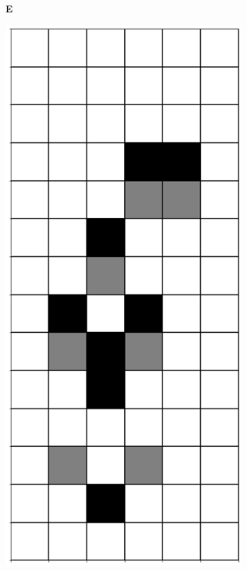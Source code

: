 \documentclass[12pt]{article}
\numberwithin{figure}{section} %
\begin{document}
\begin{figure}[H]
     	\begin{subfigure}[t]{0.03\textwidth}
    		\textbf{E}
  	\end{subfigure}		
        \begin{subfigure}{0.3\textwidth}
     		\centering
     		\includegraphics[angle=270,width=\linewidth]{Section4/7.0}

\end{subfigure}
\end{figure}
\end{document}
